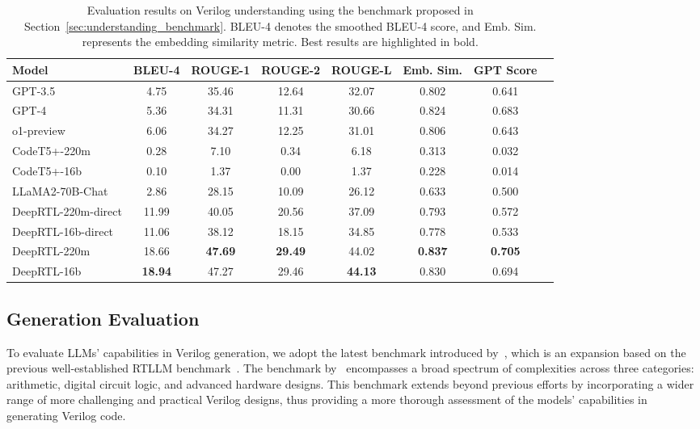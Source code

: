 \begin{table}[ht]
    \centering
    \vspace{-10pt}
    \caption{Evaluation results on Verilog understanding using the benchmark proposed in Section~\ref{sec:understanding_benchmark}. BLEU-4 denotes the smoothed BLEU-4 score, and Emb. Sim. represents the embedding similarity metric. Best results are highlighted in bold.}
    \vspace{5pt}
    \label{tab:understanding_results}
    \small{
    \begin{tabular}{@{}l|ccccccc@{}}
    \toprule
       Model  & BLEU-4 & ROUGE-1 & ROUGE-2 & ROUGE-L & Emb. Sim. & GPT Score\\
    \midrule
       GPT-3.5 & 4.75 & 35.46 & 12.64 & 32.07 & 0.802 & 0.641 \\ 
       GPT-4 & 5.36 & 34.31 & 11.31 & 30.66 & 0.824 & 0.683 \\
       o1-preview & 6.06 & 34.27 & 12.25 & 31.01 & 0.806 & 0.643\\
    \midrule
       CodeT5+-220m & 0.28 & 7.10 & 0.34 & 6.18 & 0.313 & 0.032 \\ 
       CodeT5+-16b & 0.10 & 1.37 & 0.00 & 1.37 & 0.228 & 0.014 \\
       LLaMA2-70B-Chat & 2.86 & 28.15 & 10.09 & 26.12 & 0.633 & 0.500 \\ 
       DeepRTL-220m-direct & 11.99 & 40.05 & 20.56 & 37.09 & 0.793 & 0.572\\ 
       DeepRTL-16b-direct & 11.06 & 38.12 & 18.15 & 34.85 & 0.778 & 0.533 \\ 
    \midrule
       DeepRTL-220m & 18.66 & \textbf{47.69} & \textbf{29.49} & 44.02 & \textbf{0.837} & \textbf{0.705}\\
       DeepRTL-16b & \textbf{18.94} & 47.27 & 29.46 & \textbf{44.13} & 0.830 & 0.694\\
    \bottomrule
    \end{tabular}
    }
    \vspace{-10pt}
\end{table}



\subsection{Generation Evaluation}
To evaluate LLMs' capabilities in Verilog generation, we adopt the latest benchmark introduced by~\citet{chang2024natural}, which is an expansion based on the previous well-established RTLLM benchmark~\citep{lu2024rtllm}.
The benchmark by~\citet{chang2024natural} encompasses a broad spectrum of complexities across three categories: arithmetic, digital circuit logic, and advanced hardware designs.
This benchmark extends beyond previous efforts by incorporating a wider range of more challenging and practical Verilog designs, thus providing a more thorough assessment of the models' capabilities in generating Verilog code.

